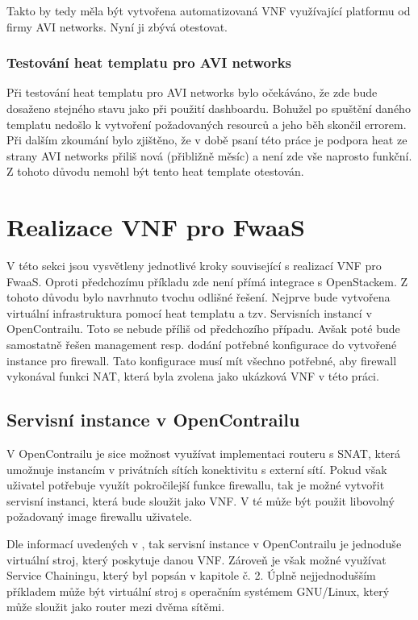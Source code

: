 Takto by tedy měla být vytvořena automatizovaná VNF využívající platformu od firmy AVI networks. Nyní ji zbývá otestovat.

\subsubsection{Testování heat templatu pro AVI networks}

Při testování heat templatu pro AVI networks bylo očekáváno, že zde bude dosaženo stejného stavu jako při použití dashboardu. Bohužel po spuštění daného templatu nedošlo k vytvoření požadovaných resourců a jeho běh skončil errorem. Při dalším zkoumání bylo zjištěno, že v době psaní této práce je podpora heat ze strany AVI networks přiliš nová (přibližně měsíc) a není zde vše naprosto funkční. Z tohoto důvodu nemohl být tento heat template otestován. 

\section{Realizace VNF pro FwaaS}

V této sekci jsou vysvětleny jednotlivé kroky související s realizací VNF pro FwaaS. Oproti předchozímu příkladu zde není přímá integrace s OpenStackem. Z tohoto důvodu bylo navrhnuto tvochu odlišné řešení. Nejprve bude vytvořena virtuální infrastruktura pomocí heat templatu a tzv. Servisních instancí v OpenContrailu. Toto se nebude příliš od předchozího případu. Avšak poté bude samostatně řešen management resp. dodání potřebné konfigurace do vytvořené instance pro firewall. Tato konfigurace musí mít všechno potřebné, aby firewall vykonával funkci NAT, která byla zvolena jako ukázková VNF v této práci.

\subsection{Servisní instance v OpenContrailu}

V OpenContrailu je sice možnost využívat implementaci routeru s SNAT, která umožnuje instancím v privátních sítích konektivitu s externí sítí. Pokud však uživatel potřebuje využít pokročilejší funkce firewallu, tak je možné vytvořit servisní instanci, která bude sloužit jako VNF. V té může být použit libovolný požadovaný image firewallu uživatele.

Dle informací uvedených v \cite{opencontrail_web}, tak servisní instance v OpenContrailu je jednoduše virtuální stroj, který poskytuje danou VNF. Zároveň je však možné využívat Service Chainingu, který byl popsán v kapitole č. 2. Úplně nejjednodušším příkladem může být virtuální stroj s operačním systémem GNU/Linux, který může sloužit jako router mezi dvěma sítěmi. 

